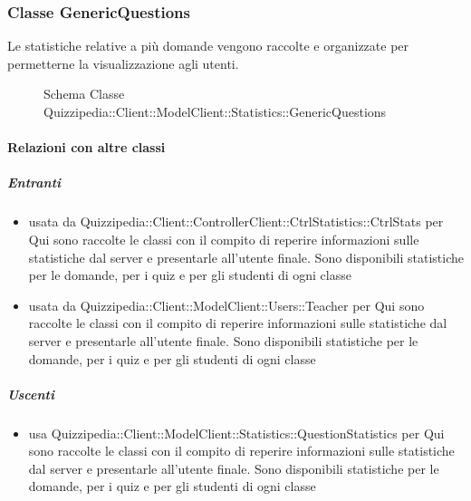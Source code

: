 \subsubsection{Classe GenericQuestions}
Le statistiche relative a più domande vengono raccolte e organizzate per permetterne la visualizzazione agli utenti.
\begin{figure}[H]
\centering
\noindent{}
\caption[Schema Classe GenericQuestions]{Schema Classe Quizzipedia::Client::ModelClient::Statistics::GenericQuestions}
\end{figure}
\paragraph{Relazioni con altre classi}
\subparagraph{Entranti}
\begin{itemize}
\item usata da Quizzipedia::Client::ControllerClient::CtrlStatistics::CtrlStats per Qui sono raccolte le classi con il compito di reperire informazioni sulle statistiche dal server e presentarle all'utente finale. Sono disponibili statistiche per le domande, per i quiz e per gli studenti di ogni classe
\item usata da Quizzipedia::Client::ModelClient::Users::Teacher per Qui sono raccolte le classi con il compito di reperire informazioni sulle statistiche dal server e presentarle all'utente finale. Sono disponibili statistiche per le domande, per i quiz e per gli studenti di ogni classe
\end{itemize}
\subparagraph{Uscenti}
\begin{itemize}
\item usa Quizzipedia::Client::ModelClient::Statistics::QuestionStatistics per Qui sono raccolte le classi con il compito di reperire informazioni sulle statistiche dal server e presentarle all'utente finale. Sono disponibili statistiche per le domande, per i quiz e per gli studenti di ogni classe
\end{itemize}
